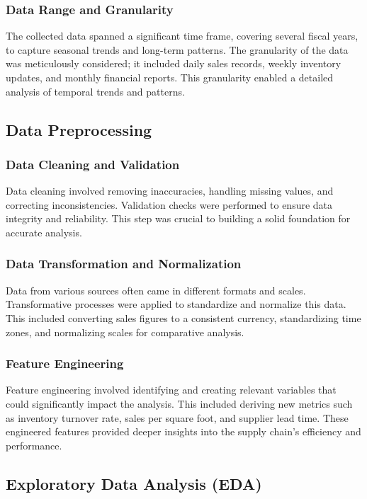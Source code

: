 \documentclass[conference]{IEEEtran}
\begin{document}
\subsubsection{Data Range and Granularity}
The collected data spanned a significant time frame, covering several fiscal years, to capture seasonal trends and long-term patterns. The granularity of the data was meticulously considered; it included daily sales records, weekly inventory updates, and monthly financial reports. This granularity enabled a detailed analysis of temporal trends and patterns.

\subsection{Data Preprocessing}

\subsubsection{Data Cleaning and Validation}
Data cleaning involved removing inaccuracies, handling missing values, and correcting inconsistencies. Validation checks were performed to ensure data integrity and reliability. This step was crucial to building a solid foundation for accurate analysis.

\subsubsection{Data Transformation and Normalization}
Data from various sources often came in different formats and scales. Transformative processes were applied to standardize and normalize this data. This included converting sales figures to a consistent currency, standardizing time zones, and normalizing scales for comparative analysis.

\subsubsection{Feature Engineering}
Feature engineering involved identifying and creating relevant variables that could significantly impact the analysis. This included deriving new metrics such as inventory turnover rate, sales per square foot, and supplier lead time. These engineered features provided deeper insights into the supply chain's efficiency and performance.

\subsection{Exploratory Data Analysis (EDA)}
\end{document}

